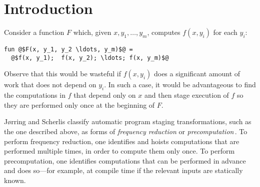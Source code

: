 
\section{Introduction}
\label{sec:intro}


Consider a function $F$ which, given $x, y_1,\dots,y_m$, computes
$f(x,y_i)$ for each $y_i$:
\begin{lstlisting}
fun @$F(x, y_1, y_2 \ldots, y_m)$@ = 
  @$f(x, y_1);  f(x, y_2); \ldots; f(x, y_m)$@
\end{lstlisting}
%
Observe that this would be wasteful if $f(x,y_i)$ does a significant 
amount of work that does not depend on $y_i$.
In such a case, it would be advantageous to find the computations in
$f$ that depend only on $x$ and then stage execution of $f$ so they are
performed only once at the beginning of $F$.



J{\o}rring and Scherlis classify automatic program staging
transformations, such as the one described above, as forms of {\em
  frequency reduction} or {\em
  precomputation}\,\cite{JS86-staging}. To perform frequency
reduction, one identifies and hoists computations that are performed
multiple times, in order to compute them only once. To perform
precomputation, one identifies computations that can be performed in
advance and does so---for example, at compile time if the relevant
inputs are statically known.

